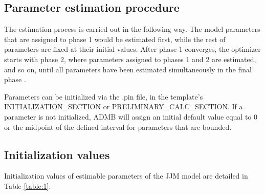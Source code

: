 \documentclass{article}
\begin{document}
\subsection{Parameter estimation procedure}
The estimation process is carried out in the following way. The model parameters that are assigned to phase 1 would be estimated first, while the rest of parameters are fixed at their initial values. After phase 1 converges, the optimizer starts with phase 2, where parameters assigned to phases 1 and 2 are estimated, and so on, until all parameters have been estimated simultaneously in the final phase \cite{fournier-2012}.

Parameters can be initialized via the .pin file, in the template's INITIALIZATION\_SECTION or PRELIMINARY\_CALC\_SECTION. If a parameter is not initialized, ADMB will assign an initial default value equal to 0 or the midpoint of the defined interval for parameters that are bounded.


\subsection{Initialization values}
Initialization values of estimable parameters of the JJM model are detailed in Table \ref{table:1}.
\end{document}
